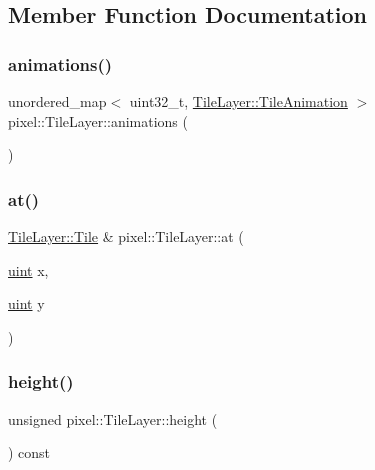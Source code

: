 \subsection{Member Function Documentation}
\mbox{\label{classpixel_1_1_tile_layer_a40c1016a17820376f26bca1d716db9ba}} 
\subsubsection{\texorpdfstring{animations()}{animations()}}
{\footnotesize\ttfamily unordered\+\_\+map$<$ uint32\+\_\+t, \hyperlink{classpixel_1_1_tile_layer_1_1_tile_animation}{Tile\+Layer\+::\+Tile\+Animation} $>$ pixel\+::\+Tile\+Layer\+::animations (\begin{DoxyParamCaption}{ }\end{DoxyParamCaption})}

\mbox{\label{classpixel_1_1_tile_layer_a290919b189e12f179cbbda6b0609ce60}} 
\subsubsection{\texorpdfstring{at()}{at()}}
{\footnotesize\ttfamily \hyperlink{structpixel_1_1_tile_layer_1_1_tile}{Tile\+Layer\+::\+Tile} \& pixel\+::\+Tile\+Layer\+::at (\begin{DoxyParamCaption}\item[{\hyperlink{namespacepixel_a6706355faabffaabebd430b2fa55843a}{uint}}]{x,  }\item[{\hyperlink{namespacepixel_a6706355faabffaabebd430b2fa55843a}{uint}}]{y }\end{DoxyParamCaption})}

\mbox{\label{classpixel_1_1_tile_layer_a97798e165a5ba01f5a2bf543e683ac34}} 
\subsubsection{\texorpdfstring{height()}{height()}}
{\footnotesize\ttfamily unsigned pixel\+::\+Tile\+Layer\+::height (\begin{DoxyParamCaption}{ }\end{DoxyParamCaption}) const}

